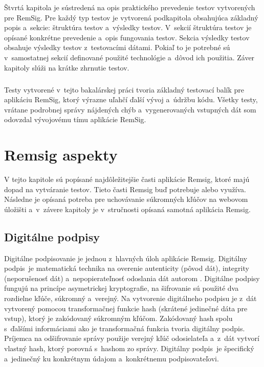 \documentclass[
  digital, %
  table,   %
oneside,
  nolof,     %
  nolot,     %
]{fithesis3}
\begin{document}
Štvrtá kapitola je sústredená na opis praktického prevedenie testov vytvorených pre RemSig. Pre každý typ testov je vytvorená podkapitola obsahujúca základný popis a~sekcie: štruktúra testov a~výsledky testov. V~sekcií štruktúra testov je opísané konkrétne prevedenie a~opis fungovania testov. Sekcia výsledky testov obsahuje výsledky testov z~testovacími dátami. Pokiaľ to je potrebné sú v~samostatnej sekcií definované použité technológie a~dôvod ich použitia. Záver kapitoly slúži na krátke zhrnutie testov.\paragraph{}
Testy vytvorené v~tejto bakalárskej práci tvoria základný testovací balík pre aplikáciu RemSig, ktorý výrazne uľahčí ďalší vývoj a~údržbu kódu. Všetky testy, vrátane podrobnej správy nájdených chýb a~vygenerovaných vstupných dát som odovzdal vývojovému tímu aplikácie RemSig.
\chapter{Remsig aspekty}
V tejto kapitole sú popísané najdôležitejšie časti aplikácie Remsig, ktoré majú dopad na vytváranie testov. Tieto časti Remsig buď potrebuje alebo využíva. Následne je opísaná potreba pre uchovávanie súkromných kľúčov na webovom úložišti a~v~závere kapitoly je v~stručnosti opísaná samotná aplikácia Remsig.
\section{Digitálne podpisy}
Digitálne podpisovanie je jednou z~hlavných úloh aplikácie Remsig. Digitálny podpis~je matematická technika na overenie autenticity (pôvod dát), integrity (neporušenosť dát) a~nepopierateľnosť odoslania dát autorom \cite{digitalSignature}.  Digitálne podpisy fungujú na princípe asymetrickej kryptografie, na šifrovanie sú použité dva rozdielne kľúče, súkromný a~verejný.
Na vytvorenie digitálneho podpisu je z~dát vytvorený pomocou transformačnej funkcie  hash (skrátené jedinečné dáta pre vstup), ktorý je zakódovaný súkromným kľúčom. Zakódovaný hash spolu s~ďalšími informáciami ako je transformačná funkcia tvoria digitálny podpis. Príjemca na odšifrovanie správy použije verejný kľúč odosielateľa a~z~dát vytvorí vlastný hash, ktorý porovná s~hashom zo správy. Digitálny podpis~je špecifický a~jedinečný ku konkrétnym údajom a~konkrétnemu podpisovateľovi.
\end{document}

